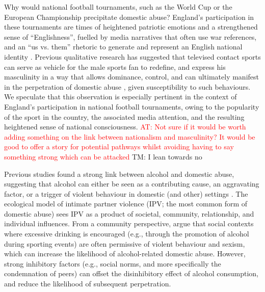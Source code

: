 \documentclass[12pt, a4paper]{article}
\newcommand{\AT}[1]{\textcolor{red}{AT: #1}}
\newcommand{\TM}[1]{\textcolor{springgreen3}{TM: #1}}
\begin{document}
Why would national football tournaments, such as the World Cup or the European Championship precipitate domestic abuse? England's participation in these tournaments are times of heightened patriotic emotions and a strengthened sense of ``Englishness'', fuelled by media narratives that often use war references, and an ``us vs. them'' rhetoric to generate and represent an English national identity \cite{Vincent2014}. Previous qualitative research has suggested that televised contact sports can serve as vehicle for the male sports fan to redefine, and express his masculinity in a way that allows dominance, control, and can ultimately manifest in the perpetration of domestic abuse \cite{Sabo,Swallow}, given susceptibility to such behaviours. We speculate that this observation is especially pertinent in the context of England's participation in national football tournaments, owing to the popularity of the sport in the country, the associated media attention, and the resulting heightened sense of national consciousness. \AT{Not sure if it would be worth adding something on the link between nationalism and masculinity? It would be good to offer a story for potential pathways whilst avoiding having to say something strong which can be attacked} \TM{I lean towards no}


Previous studies found a strong link between alcohol and domestic abuse, suggesting that alcohol can either be seen as a contributing cause, an aggravating factor, or a trigger of violent behaviour in domestic (and other) settings \cite{Leonard2017}. The ecological model of intimate partner violence (IPV; the most common form of domestic abuse) sees IPV as a product of societal, community, relationship, and individual influences. From a community perspective,  argue that social contexts where excessive drinking is encouraged (e.g., through the promotion of alcohol during sporting events) are often permissive of violent behaviour and sexism, which can increase the likelihood of alcohol-related domestic abuse. However, strong inhibitory factors (e.g., social norms, and more specifically the condemnation of peers) can offset the disinhibitory effect of alcohol consumption, and reduce the likelihood of subsequent perpetration.  

\end{document}
